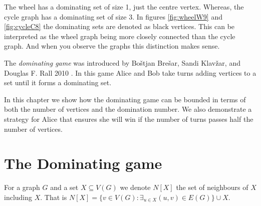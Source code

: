 The wheel has a dominating set of size 1, just the centre vertex. Whereas, the cycle graph has a dominating set of size 3. In figures  \ref{fig:wheelW9} and \ref{fig:cycleC8} the dominating sets are denoted as black vertices. This can be interpreted as the wheel graph being more closely connected than the cycle graph. And when you observe the graphs this distinction makes sense.

%
%


The \textit{dominating game} was introduced by Bo\v{s}tjan Bre\v{s}ar, Sandi Klav\v{z}ar, and Douglas F. Rall 2010 \cite{BrKlRa2010}. In this game Alice and Bob take turns adding vertices to a set until it forms a dominating set.

In this chapter we show how the dominating game can be bounded in terms of both the number of vertices and the domination number. We also demonstrate a strategy for Alice that ensures she will win if the number of turns passes half the number of vertices.

\section{The Dominating game}\label{sec:dominating_game}

For a graph $G$ and a set $X\subseteq V(G)$ we denote $N[X]$ the set of neighbours of $X$ including $X$. That is $N[X] = \{v\in V(G) : \exists_{u\in X} (u,v)\in E(G)\}\cup X$. 

